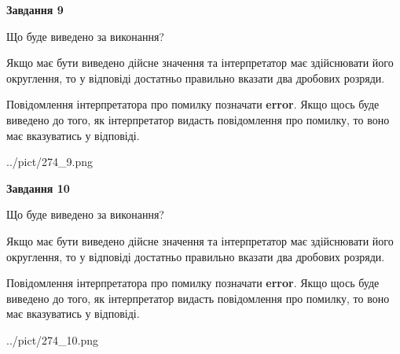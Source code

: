 \documentclass[12pt, ukrainian]{article}
\begin{document}
{\begin {Large}
{\begin {center}\textbf{Завдання 9}\end {center}}\par
Що буде виведено за виконання? \par

Якщо має бути виведено дійсне значення та інтерпретатор має здійснювати його округлення, 
то у відповіді достатньо правильно вказати два дробових розряди.

Повідомлення інтерпретатора про помилку позначати \textbf{error}.
Якщо щось буде виведено до того, як інтерпретатор видасть повідомлення про помилку, 
то воно має вказуватись у відповіді. \par

\begin{center}
	{../pict/274_9.png}
\end{center}
\newpage

{\begin {center}\textbf{Завдання 10}\end {center}}\par
Що буде виведено за виконання? \par

Якщо має бути виведено дійсне значення та інтерпретатор має здійснювати його округлення, 
то у відповіді достатньо правильно вказати два дробових розряди.

Повідомлення інтерпретатора про помилку позначати \textbf{error}.
Якщо щось буде виведено до того, як інтерпретатор видасть повідомлення про помилку, 
то воно має вказуватись у відповіді. \par

\begin{center}
	{../pict/274_10.png}
\end{center}
\newpage

\end {Large}}
\end{document}
